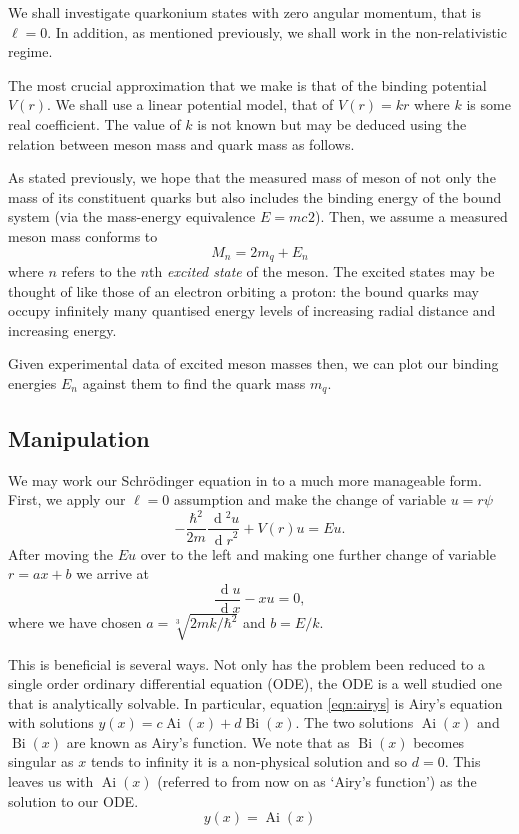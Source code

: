 \documentclass[]{article}
\renewcommand{\d}[1]{\ensuremath{\,\operatorname{d}\!{#1}}}
\newcommand{\Ai}[1]{\ensuremath{\operatorname{Ai}({#1})}}
\newcommand{\Bi}[1]{\ensuremath{\operatorname{Bi}({#1})}}
\begin{document}
We shall investigate quarkonium states with zero angular momentum, that is $\ell = 0$. In addition, as mentioned previously, we shall work in the non-relativistic regime.

The most crucial approximation that we make is that of the binding potential $V(r)$. We shall use a linear potential model, that of $V(r) = kr$ where $k$ is some real coefficient. The value of $k$ is not known but may be deduced using the relation between meson mass and quark mass as follows.

As stated previously, we hope that the measured mass of meson of not only the mass of its constituent quarks but also includes the binding energy of the bound system (via the mass-energy equivalence $E=mc^{}2$). Then, we assume a measured meson mass conforms to
\begin{equation}\label{eqn:mesonmass}
M_{n} = 2m_{q} + E_{n}
\end{equation}
where $n$ refers to the $n$th \emph{excited state} of the meson. The excited states may be thought of like those of an electron orbiting a proton: the bound quarks may occupy infinitely many quantised energy levels of increasing radial distance and increasing energy.

Given experimental data of excited meson masses then, we can plot our binding energies $E_{n}$ against them to find the quark mass $m_{q}$.

\subsection{Manipulation}

We may work our Schr\"{o}dinger equation in to a much more manageable form. First, we apply our $\ell = 0$ assumption and make the change of variable $u = r\psi$
\[
-\frac{\hbar^{2}}{2m}
 \frac{\d{^{2}u}}{\d{r}^{2}}
+ V(r)u = Eu.
\]
After moving the $Eu$ over to the left and making one further change of variable $r = ax + b$ we  arrive at
\begin{equation}\label{eqn:airys}
\frac{\d{u}}{\d{x}} - xu = 0,
\end{equation}
where we have chosen $a = \sqrt[3]{2mk/\hbar^{2}}$ and $b = E/k$.

This is beneficial is several ways. Not only has the problem been reduced to a single order ordinary differential equation (ODE), the ODE is a well studied one that is analytically solvable. In particular, equation \ref{eqn:airys} is Airy's equation with solutions $y(x) = c\Ai{x} + d\Bi{x}$. The two solutions $\Ai{x}$ and $\Bi{x}$ are known as Airy's function. We note that as $\Bi{x}$ becomes singular as $x$ tends to infinity it is a non-physical solution and so $d = 0$. This leaves us with $\Ai{x}$ (referred to from now on as `Airy's function') as the solution to our ODE.\footnotemark
\[
y(x) = \Ai{x}
\]
\end{document}
